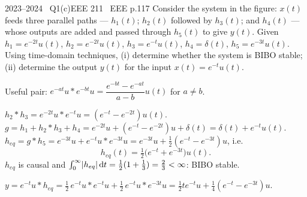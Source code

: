 \begin{qcard}{2023--2024 \textbullet\ Q1(c)}{EEE 211 \textbullet\ EEE p.1}{17}
Consider the system in the figure: $x(t)$ feeds three parallel paths --- $h_1(t)$; $h_2(t)$ followed by $h_3(t)$; and $h_4(t)$ --- whose outputs are added and passed through $h_5(t)$ to give $y(t)$. Given $h_1=e^{-2t}u(t)$, $h_2=e^{-2t}u(t)$, $h_3=e^{-t}u(t)$, $h_4=\delta(t)$, $h_5=e^{-3t}u(t)$. Using time-domain techniques, (i) determine whether the system is BIBO stable; (ii) determine the output $y(t)$ for the input $x(t)=e^{-t}u(t)$.
\end{qcard}
\begin{solution}
Useful pair: $e^{-at}u*e^{-bt}u=\dfrac{e^{-bt}-e^{-at}}{a-b}u(t)$ for $a\ne b$.

 $h_2*h_3=e^{-2t}u*e^{-t}u=(e^{-t}-e^{-2t})u(t)$.
 $g=h_1+h_2*h_3+h_4=e^{-2t}u+(e^{-t}-e^{-2t})u+\delta(t)=\delta(t)+e^{-t}u(t)$.
 $h_{eq}=g*h_5=e^{-3t}u+e^{-t}u*e^{-3t}u=e^{-3t}u+\tfrac12(e^{-t}-e^{-3t})u$, i.e.
\[h_{eq}(t)=\tfrac12\big(e^{-t}+e^{-3t}\big)u(t).\]
 $h_{eq}$ is causal and $\int_0^\infty\lvert h_{eq}\rvert\,\mathrm{d} t=\tfrac12(1+\tfrac13)=\tfrac23<\infty$: BIBO stable.

 $y=e^{-t}u*h_{eq}=\tfrac12\,e^{-t}u*e^{-t}u+\tfrac12\,e^{-t}u*e^{-3t}u=\tfrac12te^{-t}u+\tfrac14(e^{-t}-e^{-3t})u$.
\end{solution}

